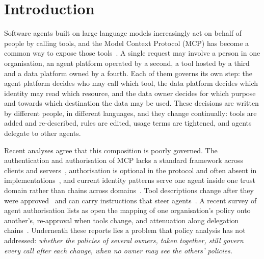 \section{Introduction}\label{sec:intro}

Software agents built on large language models increasingly act on behalf of people by calling tools, and the Model Context Protocol (MCP) has become a common way to expose those tools~\cite{mcp2025spec,hou2026mcp}. A single request may involve a person in one organisation, an agent platform operated by a second, a tool hosted by a third and a data platform owned by a fourth. Each of them governs its own step: the agent platform decides who may call which tool, the data platform decides which identity may read which resource, and the data owner decides for which purpose and towards which destination the data may be used. These decisions are written by different people, in different languages, and they change continually: tools are added and re-described, rules are edited, usage terms are tightened, and agents delegate to other agents.

Recent analyses agree that this composition is poorly governed. The authentication and authorisation of MCP lacks a standard framework across clients and servers~\cite{hou2026mcp}, authorisation is optional in the protocol and often absent in implementations~\cite{nsa2026mcp}, and current identity patterns serve one agent inside one trust domain rather than chains across domains~\cite{openid2025agentic}. Tool descriptions change after they were approved~\cite{bharti2026drift} and can carry instructions that steer agents~\cite{wang2026mcptox}. A recent survey of agent authorisation lists as open the mapping of one organisation's policy onto another's, re-approval when tools change, and attenuation along delegation chains~\cite{surapani2026authz}. Underneath these reports lies a problem that policy analysis has not addressed: \emph{whether the policies of several owners, taken together, still govern every call after each change, when no owner may see the others' policies.}

